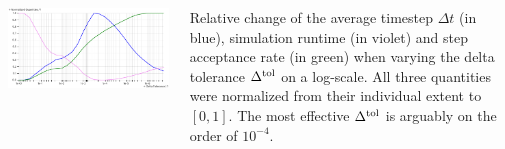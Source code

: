 \documentclass[25pt, a0paper, portrait]{tikzposter}
\begin{document}
\begin{columns}
{      \includegraphics[width=\linewidth]{../../figures/results/delta-tolerance.pdf}

      Relative change of the average timestep $\Delta t$ (in blue), simulation runtime (in violet) and step acceptance rate (in green) when varying the delta tolerance $\Delta^{\rm tol}$ on a log-scale. All three quantities were normalized from their individual extent to $[0, 1]$. The most effective $\Delta^{\rm tol}$ is arguably on the order of $10^{-4}$.
      \vspace*{-1.0cm}
    }


\end{columns}
\end{document}

